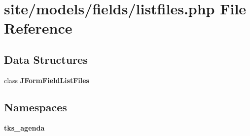 \section{site/models/fields/listfiles.php File Reference}
\label{site_2models_2fields_2listfiles_8php}
\subsection*{Data Structures}
\begin{DoxyCompactItemize}
\item 
class \textbf{ J\+Form\+Field\+List\+Files}
\end{DoxyCompactItemize}
\subsection*{Namespaces}
\begin{DoxyCompactItemize}
\item 
 \textbf{ tks\+\_\+agenda}
\end{DoxyCompactItemize}
